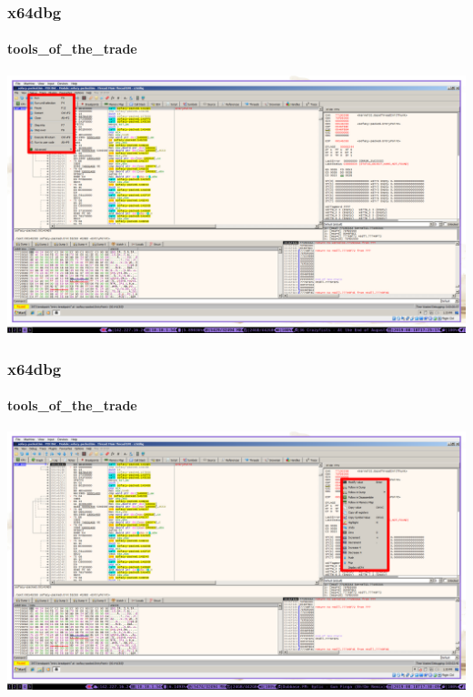 \documentclass[aspectratio=169]{beamer}
\begin{document}
\begin{frame}
  \frametitle{x64dbg}
  \framesubtitle{tools\_of\_the\_trade}
  \begin{center}
    \includegraphics[scale=0.75]{x64dbg-navigation}
  \end{center}
\end{frame}

\begin{frame}
  \frametitle{x64dbg}
  \framesubtitle{tools\_of\_the\_trade}
  \begin{center}
    \includegraphics[scale=0.75]{x64dbg-context-menu}
  \end{center}
\end{frame}
\end{document}
